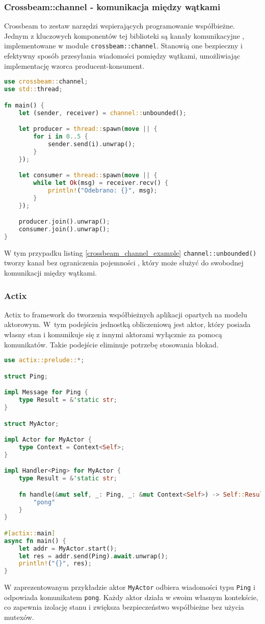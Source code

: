 \subsubsection{Crossbeam::channel - komunikacja między wątkami}
Crossbeam to zestaw narzędzi wspierających programowanie współbieżne. Jednym z kluczowych komponentów tej biblioteki są kanały komunikacyjne , implementowane w module \texttt{crossbeam::channel}. Stanowią one bezpieczny i efektywny sposób przesyłania wiadomości pomiędzy wątkami, umożliwiając implementację wzorca producent-konsument.

\begin{lstlisting}[language=Rust, caption=Przykład użycia kanałów Crossbeam, label=crossbeam_channel_example]
use crossbeam::channel;
use std::thread;

fn main() {
    let (sender, receiver) = channel::unbounded();

    let producer = thread::spawn(move || {
        for i in 0..5 {
            sender.send(i).unwrap();
        }
    });

    let consumer = thread::spawn(move || {
        while let Ok(msg) = receiver.recv() {
            println!("Odebrano: {}", msg);
        }
    });

    producer.join().unwrap();
    consumer.join().unwrap();
}
\end{lstlisting}
W tym przypadku listing \ref{crossbeam_channel_example} \texttt{channel::unbounded()} tworzy kanał bez ograniczenia pojemności , który może służyć do swobodnej komunikacji między wątkami.
\subsubsection{Actix}
Actix to framework do tworzenia współbieżnych aplikacji opartych na modelu aktorowym. W~tym podejściu jednostką obliczeniową jest aktor, który posiada własny stan i komunikuje się z innymi aktorami wyłącznie za pomocą komunikatów. Takie podejście eliminuje potrzebę stosowania blokad.
\begin{lstlisting}[language=Rust, caption=Przykład użycia Actix, label=actix_example]
use actix::prelude::*;

struct Ping;

impl Message for Ping {
    type Result = &'static str;
}

struct MyActor;

impl Actor for MyActor {
    type Context = Context<Self>;
}

impl Handler<Ping> for MyActor {
    type Result = &'static str;

    fn handle(&mut self, _: Ping, _: &mut Context<Self>) -> Self::Result {
        "pong"
    }
}

#[actix::main]
async fn main() {
    let addr = MyActor.start();
    let res = addr.send(Ping).await.unwrap();
    println!("{}", res);
}
\end{lstlisting}
W zaprezentowanym przykładzie aktor \texttt{MyActor} odbiera wiadomości typu \texttt{Ping} i odpowiada komunikatem \texttt{pong}. Każdy aktor działa w swoim własnym kontekście, co zapewnia izolację stanu i zwiększa bezpieczeństwo współbieżne bez użycia mutexów.

